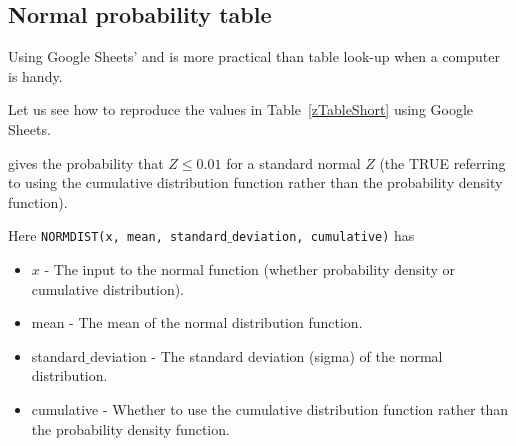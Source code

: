 \subsection{Normal probability table}

Using Google Sheets'  and  is more practical than table look-up when a computer is handy.

Let us see how to reproduce the values in Table~\ref{zTableShort} using Google Sheets.


gives the probability that $Z\le 0.01$ for a standard normal $Z$ (the TRUE referring to using the cumulative distribution function rather than the probability density function).

Here
\texttt{NORMDIST(x, mean, standard$\_$deviation, cumulative)}
has
\begin{itemize}
\item $x$ - The input to the normal function (whether probability density or cumulative distribution).
\item mean - The mean of the normal distribution function.
\item standard$\_$deviation - The standard deviation (sigma) of the normal distribution.
\item cumulative - Whether to use the cumulative distribution function rather than the probability density function.
\end{itemize}


